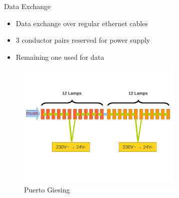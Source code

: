 \documentclass{beamer}
\begin{document}
  \begin{frame}{Data Exchange}
    \begin{itemize}
      \item Data exchange over regular ethernet cables
      \item 3 conductor pairs reserved for power supply
      \item Remaining one used for data
    \end{itemize}
      \begin{figure}
        \includegraphics[width=8cm, clip, trim= 0cm 4.6cm 0.5cm 4cm]{bilder/12lampen_rs485.pdf}
        \caption{Puerto Giesing}
      \end{figure}
  \end{frame}
\end{document}
